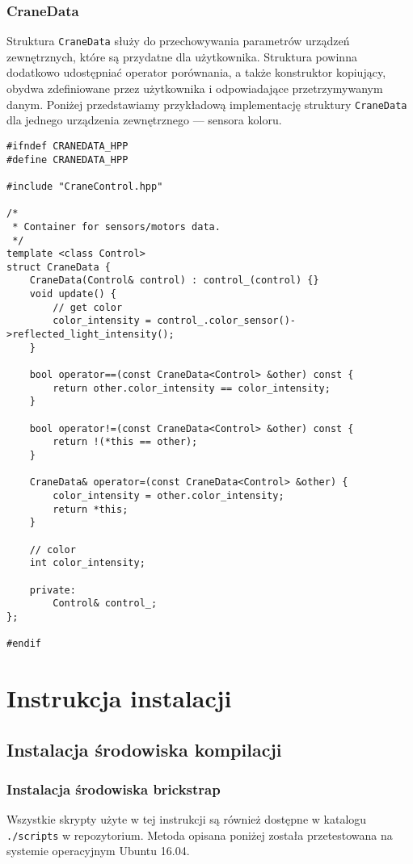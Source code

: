 \documentclass{article}
\begin{document}
\subsubsection*{CraneData}
Struktura \texttt{CraneData} służy do przechowywania parametrów
urządzeń zewnętrznych, które są przydatne dla użytkownika. Struktura powinna
dodatkowo udostępniać operator porównania, a także konstruktor kopiujący, obydwa
zdefiniowane przez użytkownika i odpowiadające przetrzymywanym danym. Poniżej
przedstawiamy przykładową implementację struktury \texttt{CraneData} dla jednego
urządzenia zewnętrznego --- sensora koloru.
\begin{lstlisting}
#ifndef CRANEDATA_HPP
#define CRANEDATA_HPP

#include "CraneControl.hpp"

/*
 * Container for sensors/motors data.
 */
template <class Control>
struct CraneData {
    CraneData(Control& control) : control_(control) {}
    void update() {
        // get color
        color_intensity = control_.color_sensor()->reflected_light_intensity();
    }

    bool operator==(const CraneData<Control> &other) const {
        return other.color_intensity == color_intensity;
    }

    bool operator!=(const CraneData<Control> &other) const {
        return !(*this == other);
    }

    CraneData& operator=(const CraneData<Control> &other) {
        color_intensity = other.color_intensity;
        return *this;
    }

    // color
    int color_intensity;

    private:
        Control& control_;
};

#endif
\end{lstlisting}
\section{Instrukcja instalacji}\label{installation}
\subsection{Instalacja środowiska kompilacji}
\subsubsection*{Instalacja środowiska brickstrap}\label{instr_brickstrap}
Wszystkie skrypty użyte w tej instrukcji są również dostępne w katalogu
\texttt{./scripts} w repozytorium. Metoda opisana poniżej została
przetestowana na systemie operacyjnym Ubuntu 16.04.
\end{document}
